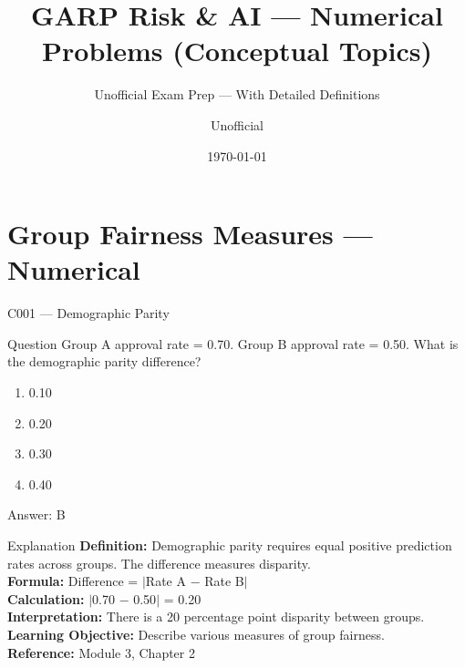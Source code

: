 \documentclass[aspectratio=169,8pt]{beamer}
\title[GARP RAI]{GARP Risk \& AI --- Numerical Problems (Conceptual Topics)}
\subtitle{Unofficial Exam Prep --- With Detailed Definitions}
\author{Unofficial}
\date{\today}
\begin{document}
	
	\begin{frame}
		\titlepage
	\end{frame}
	
	\section{Group Fairness Measures --- Numerical}
	
	\begin{frame}{C001 --- Demographic Parity}
		\begin{block}{Question}
			Group A approval rate = 0.70. Group B approval rate = 0.50. What is the demographic parity difference?
			\begin{enumerate}
				\item 0.10
				\item 0.20
				\item 0.30
				\item 0.40
			\end{enumerate}
		\end{block}
		\begin{exampleblock}{Answer: B}\end{exampleblock}
		\begin{block}{Explanation}
			\textbf{Definition:} Demographic parity requires equal positive prediction rates across groups. The difference measures disparity.\\
			\textbf{Formula:} Difference = $|$Rate A $-$ Rate B$|$\\
			\textbf{Calculation:} $|$0.70 $-$ 0.50$|$ = 0.20\\
			\textbf{Interpretation:} There is a 20 percentage point disparity between groups.\\
			\textbf{Learning Objective:} Describe various measures of group fairness.\\
			\textbf{Reference:} Module 3, Chapter 2
		\end{block}
	\end{frame}
	
\end{document}
